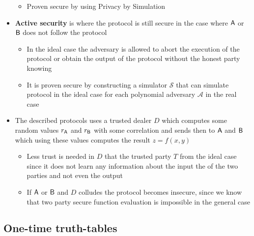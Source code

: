 \begin{itemize}
\begin{itemize}
        \item Proven secure by using Privacy by Simulation
    \end{itemize}
    \item \textbf{Active security} is where the protocol is still secure in the case where $\mathsf{A}$ or $\mathsf{B}$ does not follow the protocol
    \begin{itemize}
        \item In the ideal case the adversary is allowed to abort the execution of the protocol or obtain the output of the protocol without the honest party knowing
        \item It is proven secure by constructing a simulator $\mathcal S$ that can simulate protocol in the ideal case for each polynomial adversary $\mathcal A$ in the real case
    \end{itemize}
    \item The described protocols uses a trusted dealer $D$ which computes some random values $r_{\mathsf{A}}$ and $r_{\mathsf{B}}$ with some correlation and sends then to $\mathsf{A}$ and $\mathsf{B}$ which using these values computes the result $z = f(x,y)$
    \begin{itemize}
        \item Less trust is needed in $D$ that the trusted party $T$ from the ideal case since it does not learn any information about the input the of the two parties and not even the output
        \item If $\mathsf{A}$ or $\mathsf{B}$ and $D$ colludes the protocol becomes insecure, since we know that two party secure function evaluation is impossible in the general case
    \end{itemize}
\end{itemize}

\subsection{One-time truth-tables}%
